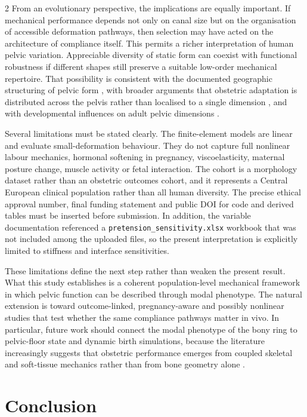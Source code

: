 \documentclass[openacc]{rsproca_new}
\begin{document}
\begin{multicols}{2}
From an evolutionary perspective, the implications are equally important. If mechanical performance depends not only on canal size but on the organisation of accessible deformation pathways, then selection may have acted on the architecture of compliance itself. This permits a richer interpretation of human pelvic variation. Appreciable diversity of static form can coexist with functional robustness if different shapes still preserve a suitable low-order mechanical repertoire. That possibility is consistent with the documented geographic structuring of pelvic form \cite{BettiManica2018,Auerbach2018}, with broader arguments that obstetric adaptation is distributed across the pelvis rather than localised to a single dimension \cite{KurkiDecrausaz2015}, and with developmental influences on adult pelvic dimensions \cite{VerbruggenNowlan2017,Novak2020}.

Several limitations must be stated clearly. The finite-element models are linear and evaluate small-deformation behaviour. They do not capture full nonlinear labour mechanics, hormonal softening in pregnancy, viscoelasticity, maternal posture change, muscle activity or fetal interaction. The cohort is a morphology dataset rather than an obstetric outcomes cohort, and it represents a Central European clinical population rather than all human diversity. The precise ethical approval number, final funding statement and public DOI for code and derived tables must be inserted before submission. In addition, the variable documentation referenced a \texttt{pretension\_sensitivity.xlsx} workbook that was not included among the uploaded files, so the present interpretation is explicitly limited to stiffness and interface sensitivities.

These limitations define the next step rather than weaken the present result. What this study establishes is a coherent population-level mechanical framework in which pelvic function can be described through modal phenotype. The natural extension is toward outcome-linked, pregnancy-aware and possibly nonlinear studies that test whether the same compliance pathways matter in vivo. In particular, future work should connect the modal phenotype of the bony ring to pelvic-floor state and dynamic birth simulations, because the literature increasingly suggests that obstetric performance emerges from coupled skeletal and soft-tissue mechanics rather than from bone geometry alone \cite{Pavlicev2020,Fremondiere2022}.

\section{Conclusion}


\end{multicols}
\end{document}
